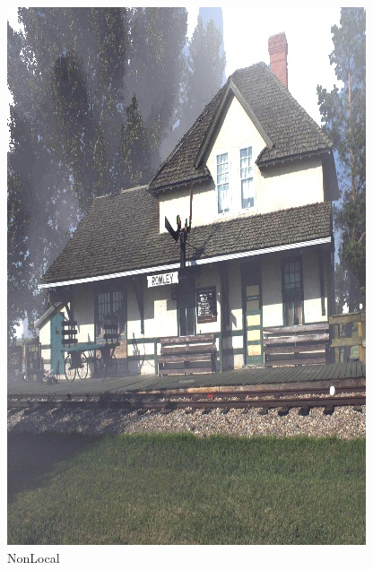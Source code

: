 \documentclass[12pt]{article}
\begin{document}
\begin{figure}[!h]
\begin{minipage}[t]{0.24\linewidth}
        \includegraphics[width=0.9\linewidth]{sample_pictures/after_HazeRD_NonLocal.jpg}
        \caption*{NonLocal}
    \end{minipage}
 \end{figure}\par
\end{document}
